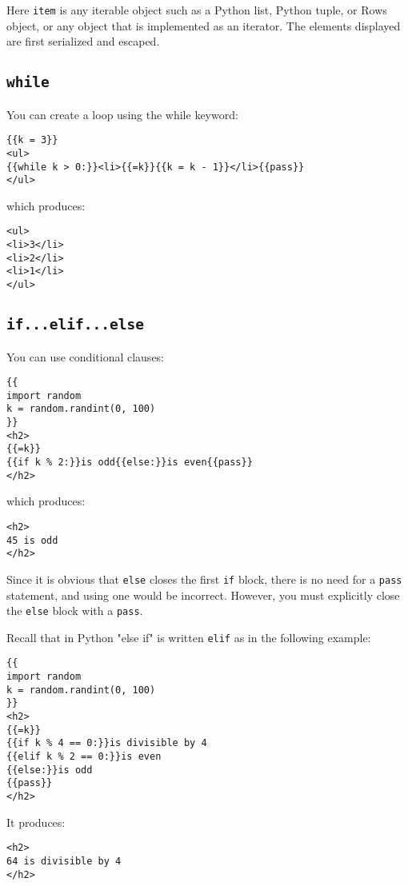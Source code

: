 \documentclass[justified,sixbynine,notoc]{tufte-book}
\def\ft{\small\tt}
\def\inxx#1{\index{#1}}
\begin{document}
\begin{fullwidth}
Here {\ft item} is any iterable object such as a Python list, Python tuple, or Rows object, or any object that is implemented as an iterator. The elements displayed are first serialized and escaped.

\goodbreak\subsection{{\ft while}}

\inxx{while}

You can create a loop using the while keyword:
\begin{lstlisting}[keywords={}]
{{k = 3}}
<ul>
{{while k > 0:}}<li>{{=k}}{{k = k - 1}}</li>{{pass}}
</ul>
\end{lstlisting}
\noindent which produces:
\begin{lstlisting}[keywords={}]
<ul>
<li>3</li>
<li>2</li>
<li>1</li>
</ul>
\end{lstlisting}

\goodbreak\subsection{{\ft if...elif...else}}

\inxx{if} \inxx{elif} \inxx{else}

You can use conditional clauses:
\begin{lstlisting}[keywords={}]
{{
import random
k = random.randint(0, 100)
}}
<h2>
{{=k}}
{{if k % 2:}}is odd{{else:}}is even{{pass}}
</h2>
\end{lstlisting}
\noindent which produces:
\begin{lstlisting}[keywords={}]
<h2>
45 is odd
</h2>
\end{lstlisting}

Since it is obvious that {\ft else} closes the first {\ft if} block, there is no need for a {\ft pass} statement, and using one would be incorrect. However, you must explicitly close the {\ft else} block with a {\ft pass}.

Recall that in Python "else if" is written {\ft elif} as in the following example:
\begin{lstlisting}[keywords={}]
{{
import random
k = random.randint(0, 100)
}}
<h2>
{{=k}}
{{if k % 4 == 0:}}is divisible by 4
{{elif k % 2 == 0:}}is even
{{else:}}is odd
{{pass}}
</h2>
\end{lstlisting}

It produces:
\begin{lstlisting}[keywords={}]
<h2>
64 is divisible by 4
</h2>
\end{lstlisting}


\end{fullwidth}
\end{document}
